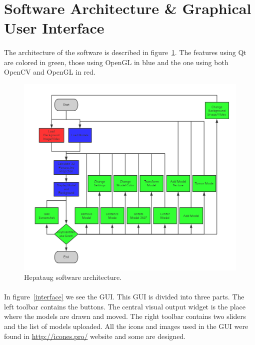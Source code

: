\documentclass[12pt]{report}
\begin{document}
\section{Software Architecture \& Graphical User Interface}

\paragraph{}
The architecture of the software is described in figure~\ref{diagram}. The features using Qt are colored in green, those using OpenGL in blue and the one using both OpenCV and OpenGL in red.

\begin{figure}[H]
\centerline{\includegraphics[scale = 0.6]{img/diagram.png}}
\caption{Hepataug software architecture.}
\label{diagram}
\end{figure}

\paragraph{}
	In figure~\ref{interface} we see the GUI. This GUI is divided into three parts. The left toolbar contains the buttons. The central visual output widget is the place where the models are drawn and moved. The right toolbar contains two sliders and the list of models uploaded.
	All the icons and images used in the GUI were found in \url{http://icones.pro/} website and some are designed.
\end{document}
